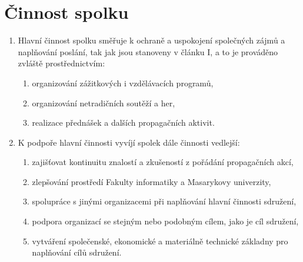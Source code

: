 \documentclass[11pt]{article}
\begin{document}
\section{Činnost spolku}
\begin{enumerate}
\item Hlavní činnost spolku směřuje k ochraně a uspokojení společných zájmů a naplňování poslání, tak jak jsou stanoveny v článku I, a to je prováděno zvláště prostřednictvím: 
\begin{enumerate}
\item organizování zážitkových i vzdělávacích programů,
\item organizování netradičních soutěží a her,
\item realizace přednášek a dalších propagačních aktivit.
\end{enumerate}
\item K podpoře hlavní činnosti vyvíjí spolek dále činnosti vedlejší: 
\begin{enumerate}
\item zajišťovat kontinuitu znalostí a zkušeností z pořádání propagačních akcí,
\item zlepšování prostředí Fakulty informatiky a Masarykovy univerzity,
\item spolupráce s jinými organizacemi při naplňování hlavní činnosti sdružení,
\item podpora organizací se stejným nebo podobným cílem, jako je cíl sdružení,
\item vytváření společenské, ekonomické a materiálně technické základny pro naplňování cílů sdružení.
\end{enumerate}
\end{enumerate}
\end{document}
